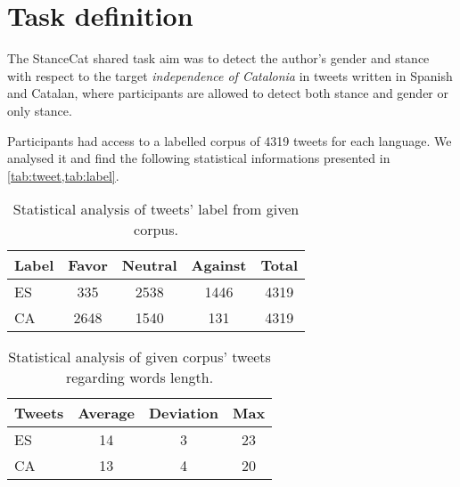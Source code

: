 \section{Task definition} \label{sec:task}

The StanceCat shared task aim was to detect the author's gender and stance with respect to the target \emph{independence of Catalonia} in tweets written in Spanish and Catalan, where participants are allowed to detect both stance and gender or only stance.

Participants had access to a labelled corpus of 4319 tweets for each language. We analysed it and find the following statistical informations presented in \cref{tab:tweet,tab:label}.

\begin{table}[h]
\footnotesize
\centering
\begin{tabular}{l|cccc}
\toprule
\hline
Label		& Favor		& Neutral		& Against	& Total		\\
\hline
ES			& 335		& 2538			& 1446		& 4319		\\
CA			& 2648		& 1540			& 131		& 4319		\\
\hline
\bottomrule
\end{tabular}
\caption{Statistical analysis of tweets' label from given corpus.}
\label{tab:label}
\end{table}

\begin{table}[h]
\footnotesize
\centering
\begin{tabular}{l|ccc}
\toprule
\hline
Tweets		& Average		& Deviation		& Max		\\
\hline
ES			& 14			& 3				& 23		\\ 
CA			& 13			& 4				& 20		\\ 
\hline
\bottomrule
\end{tabular}
\caption{Statistical analysis of given corpus' tweets regarding words length.}
\label{tab:tweet}
\end{table}


